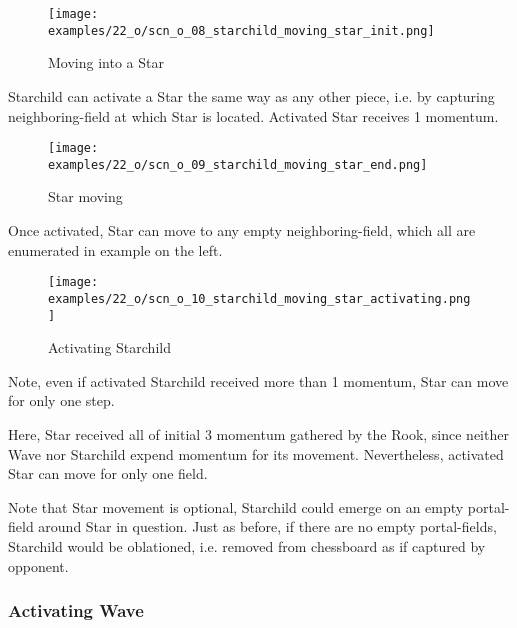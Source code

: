 \noindent
\begin{wrapfigure}[5]{l}{0.4\textwidth}
\centering
\texttt{[image: examples/22\_o/scn\_o\_08\_starchild\_moving\_star\_init.png]}
\caption{Moving into a Star}
\label{fig:scn_o_08_starchild_moving_star_init}
\end{wrapfigure}
Starchild can activate a Star the same way as any other piece, i.e. by capturing
neighboring-field at which Star is located. Activated Star receives 1 momentum.

\vspace*{2.1\baselineskip}
\noindent
\begin{wrapfigure}[4]{l}{0.4\textwidth}
\centering
\texttt{[image: examples/22\_o/scn\_o\_09\_starchild\_moving\_star\_end.png]}
\caption{Star moving}
\label{fig:scn_o_09_starchild_moving_star_end}
\end{wrapfigure}
Once activated, Star can move to any empty neighboring-field, which all are enumerated
in example on the left.

\vspace*{2.3\baselineskip}
\noindent
\begin{wrapfigure}[9]{l}{0.4\textwidth}
\centering
\texttt{[image: examples/22\_o/scn\_o\_10\_starchild\_moving\_star\_activating.png]}
\caption{Activating Starchild}
\label{fig:scn_o_10_starchild_moving_star_activating}
\end{wrapfigure}
Note, even if activated Starchild received more than 1 momentum, Star can move for
only one step.

Here, Star received all of initial 3 momentum gathered by the Rook, since neither
Wave nor Starchild expend momentum for its movement. Nevertheless, activated Star
can move for only one field.

Note that Star movement is optional, Starchild could emerge on an empty portal-field
around Star in question. Just as before, if there are no empty portal-fields, Starchild
would be oblationed, i.e. removed from chessboard as if captured by opponent.

\clearpage %

\subsubsection*{Activating Wave}

